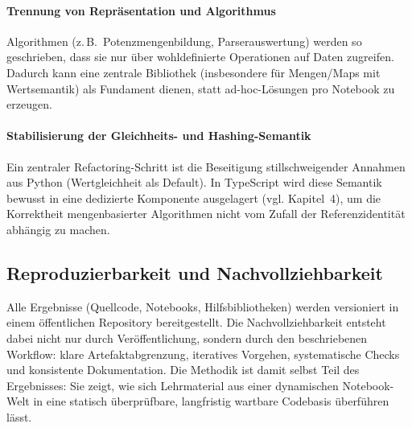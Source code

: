 \paragraph{Trennung von Repräsentation und Algorithmus}
Algorithmen (z.\,B.\ Potenzmengenbildung, Parserauswertung) werden so geschrieben, dass sie nur über wohldefinierte Operationen auf Daten zugreifen. Dadurch kann eine zentrale Bibliothek (insbesondere für Mengen/Maps mit Wertsemantik) als Fundament dienen, statt ad-hoc-Lösungen pro Notebook zu erzeugen.

\paragraph{Stabilisierung der Gleichheits- und Hashing-Semantik}
Ein zentraler Refactoring-Schritt ist die Beseitigung stillschweigender Annahmen aus Python (Wertgleichheit als Default). In TypeScript wird diese Semantik bewusst in eine dedizierte Komponente ausgelagert (vgl. Kapitel~4), um die Korrektheit mengenbasierter Algorithmen nicht vom Zufall der Referenzidentität abhängig zu machen.

\subsection{Reproduzierbarkeit und Nachvollziehbarkeit}
\label{subsec:methodik_repro}

Alle Ergebnisse (Quellcode, Notebooks, Hilfsbibliotheken) werden versioniert in einem öffentlichen Repository bereitgestellt. Die Nachvollziehbarkeit entsteht dabei nicht nur durch Veröffentlichung, sondern durch den beschriebenen Workflow: klare Artefaktabgrenzung, iteratives Vorgehen, systematische Checks und konsistente Dokumentation. Die Methodik ist damit selbst Teil des Ergebnisses: Sie zeigt, wie sich Lehrmaterial aus einer dynamischen Notebook-Welt in eine statisch überprüfbare, langfristig wartbare Codebasis überführen lässt.